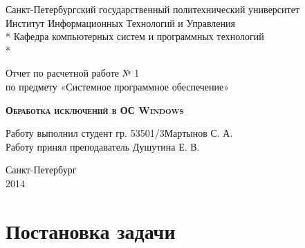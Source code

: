 \documentclass[a4paper, 12pt]{report}		%
\begin{document}
\begin{titlepage}
\thispagestyle{empty}

\begin{center}
Санкт-Петербургский государственный политехнический университет \\
Институт Информационных Технологий и Управления \\*
Кафедра компьютерных систем и программных технологий \\*
\hrulefill
\end{center}

\vspace{18em}

\begin{center}
\Large Отчет по расчетной работе № 1 \\ по предмету «Системное программное обеспечение» \\
\end{center}

\vspace{1em}

\begin{center}
\textsc{\textbf{Обработка исключений в ОС Windows}}
\end{center}

\vspace{16em}

\begin{flushleft}
Работу выполнил студент гр. 53501/3\hrulefill Мартынов С. А. \\
\vspace{1.5em}
Работу принял преподаватель \hrulefill Душутина Е. В. \\
\end{flushleft}

\vspace{\fill}

\begin{center}
Санкт-Петербург \\
2014
\end{center}

\end{titlepage}
\setcounter{page}{2}
\tableofcontents

\chapter*{Постановка задачи}
\end{document}
